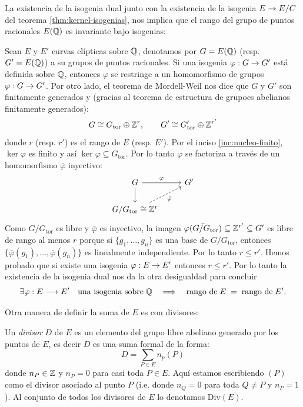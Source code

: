\documentclass[../../tesis_maestria]{subfiles}
\begin{document}
\begin{nota}
	La existencia de la isogenia dual	junto con la existencia de la isogenia $E\rightarrow E/C$ del teorema \ref{thm:kernel-isogenias}, nos implica que el rango del grupo de puntos racionales $E(\mathbb{Q})$ es invariante bajo isogenias:
	
	Sean $E$ y $E'$ curvas elípticas sobre $\mathbb{Q}$, denotamos por $G=E(\mathbb{Q})$ (resp. $G'=E(\mathbb{Q})$) a su grupos de puntos racionales. Si una isogenia $\varphi:G\rightarrow G'$ está definida sobre $\mathbb{Q}$, entonces $\varphi$ se restringe a un homomorfismo de grupos $\varphi:G\rightarrow G'$. Por otro lado, el teorema de Mordell-Weil nos dice que $G$ y $G'$ son finitamente generados y (gracias al teorema de estructura de grupoes abelianos finitamente generados):
\[
	G\cong G_\mathrm{tor}\oplus\mathbb{Z}^r,\qquad G'\cong G'_\mathrm{tor}\oplus\mathbb{Z}^{r'}
\]
donde $r$ (resp. $r'$) es el rango de $E$ (resp. $E'$). Por el inciso \ref{inc:nucleo-finito}, $\ker\varphi$ es finito y así $\ker\varphi\subseteq G_\mathrm{tor}$. Por lo tanto $\varphi$ se factoriza a través de un homomorfismo $\bar{\varphi}$ inyectivo:
\[
	\begin{tikzcd}
		G \arrow[d] \arrow[r,"\varphi"] & G' \\
		G/G_\mathrm{tor}\cong\ZZ^r \arrow[ur,dashed,"\bar{\varphi}"']
	\end{tikzcd}
\]
Como $G/G_\mathrm{tor}$ es libre y $\bar{\varphi}$ es inyectivo, la imagen $\bar{\varphi(G/G_\mathrm{tor})}\subseteq\mathbb{Z}^{r'}\subseteq G'$ es libre de rango al menos $r$ porque si $\{g_1,\ldots,g_n\}$ es una base de $G/G_\mathrm{tor}$, entonces $\{\bar{\varphi}(g_1),\ldots,\bar{\varphi}(g_n)\}$ es linealmente independiente. Por lo tanto $r\leq r'$. Hemos probado que si existe una isogenia $\varphi:E\rightarrow E'$ entonces $r\leq r'$.  Por lo tanto la existencia de la isogenia dual nos da la otra desigualdad para concluir
\[
	\exists \varphi: E\longrightarrow E' \quad\text{una isogenia sobre}\;\mathbb{Q}\quad\Longrightarrow\quad
	\text{rango de}\; E \;= \;\text{rango de}\; E'.
\]
\end{nota}

Otra manera de definir la suma de $E$ es con divisores:

\begin{defin}
  Un \emph{divisor} $D$ de $E$ es un elemento del grupo libre abeliano generado por los puntos de
  $E$, es decir $D$ es una suma formal de la forma:
  \[
    D=\sum_{P\in E}n_p(P)
  \]
  donde $n_P\in\mathbb{Z}$ y $n_P=0$ para casi toda $P\in E$. Aqu\'i estamos escribiendo $(P)$ como el divisor
  asociado al punto $P$ (i.e. donde $n_Q=0$ para toda $Q\neq P$ y $n_P=1$). Al conjunto de todos los
  divisores de $E$ lo denotamos Div$(E)$.
\end{defin}
\end{document}
